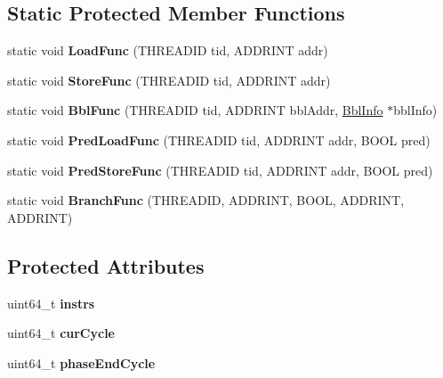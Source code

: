 \subsection*{Static Protected Member Functions}
\begin{DoxyCompactItemize}
\item 
\hypertarget{classNullCore_a9ab27a5bee6a8ea42d21b61b261e5ba6}{static void {\bfseries Load\-Func} (T\-H\-R\-E\-A\-D\-I\-D tid, A\-D\-D\-R\-I\-N\-T addr)}\label{classNullCore_a9ab27a5bee6a8ea42d21b61b261e5ba6}

\item 
\hypertarget{classNullCore_a691fe50021d9c1bf60a082a6ed3f8275}{static void {\bfseries Store\-Func} (T\-H\-R\-E\-A\-D\-I\-D tid, A\-D\-D\-R\-I\-N\-T addr)}\label{classNullCore_a691fe50021d9c1bf60a082a6ed3f8275}

\item 
\hypertarget{classNullCore_ab39db2af3c311625b3fc90d91c1e4a9c}{static void {\bfseries Bbl\-Func} (T\-H\-R\-E\-A\-D\-I\-D tid, A\-D\-D\-R\-I\-N\-T bbl\-Addr, \hyperlink{structBblInfo}{Bbl\-Info} $\ast$bbl\-Info)}\label{classNullCore_ab39db2af3c311625b3fc90d91c1e4a9c}

\item 
\hypertarget{classNullCore_a68c4e6099ba2842d2b65bd0df5b8440e}{static void {\bfseries Pred\-Load\-Func} (T\-H\-R\-E\-A\-D\-I\-D tid, A\-D\-D\-R\-I\-N\-T addr, B\-O\-O\-L pred)}\label{classNullCore_a68c4e6099ba2842d2b65bd0df5b8440e}

\item 
\hypertarget{classNullCore_ab5a9f6914b66ee69d8576a8a76e2aad1}{static void {\bfseries Pred\-Store\-Func} (T\-H\-R\-E\-A\-D\-I\-D tid, A\-D\-D\-R\-I\-N\-T addr, B\-O\-O\-L pred)}\label{classNullCore_ab5a9f6914b66ee69d8576a8a76e2aad1}

\item 
\hypertarget{classNullCore_ab2805cc932388c43a83d55556742b829}{static void {\bfseries Branch\-Func} (T\-H\-R\-E\-A\-D\-I\-D, A\-D\-D\-R\-I\-N\-T, B\-O\-O\-L, A\-D\-D\-R\-I\-N\-T, A\-D\-D\-R\-I\-N\-T)}\label{classNullCore_ab2805cc932388c43a83d55556742b829}

\end{DoxyCompactItemize}
\subsection*{Protected Attributes}
\begin{DoxyCompactItemize}
\item 
\hypertarget{classNullCore_a546157d127fa2a570166854d5c7cc065}{uint64\-\_\-t {\bfseries instrs}}\label{classNullCore_a546157d127fa2a570166854d5c7cc065}

\item 
\hypertarget{classNullCore_a3974cccfba88af1227f7915d251763ad}{uint64\-\_\-t {\bfseries cur\-Cycle}}\label{classNullCore_a3974cccfba88af1227f7915d251763ad}

\item 
\hypertarget{classNullCore_adb6af023ef40930dd8e3d0dd81ffcf09}{uint64\-\_\-t {\bfseries phase\-End\-Cycle}}\label{classNullCore_adb6af023ef40930dd8e3d0dd81ffcf09}

\end{DoxyCompactItemize}


